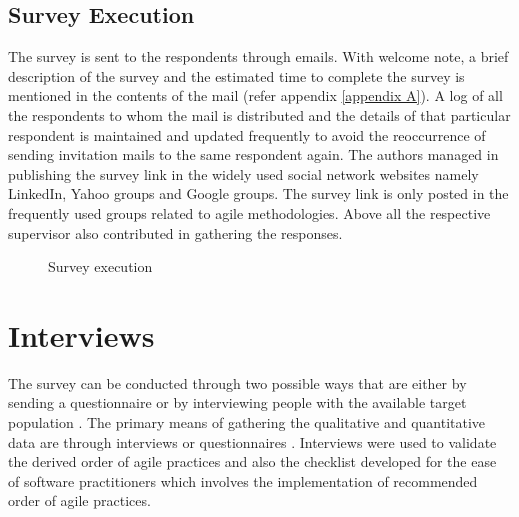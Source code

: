 \documentclass[a4paper,oneside]{bth}
\begin{document}
\subsection{Survey Execution}
The survey is sent to the respondents through emails.  With welcome note, a brief description of the survey and the estimated time to complete the survey is mentioned in the contents of the mail (refer appendix \ref{appendix A}). A log of all the respondents to whom the mail is distributed and the details of that particular respondent is maintained and updated frequently to avoid the reoccurrence of sending invitation mails to the same respondent again. The authors managed in publishing the survey link in the widely used social network websites namely LinkedIn, Yahoo groups and Google groups. The survey link is only posted in the frequently used groups related to agile methodologies. Above all the respective supervisor also contributed in gathering the responses.
\begin{figure}[h]
\centering
\label{Survey execution}
\caption{Survey execution}
\end{figure}
\newpage
\section{Interviews}
The survey can be conducted through two possible ways that are either by sending a questionnaire or by interviewing people with the available target population \cite{wohlin_empirical_2003}. The primary means of gathering the qualitative and quantitative data are through interviews or questionnaires \cite{wohlin_empirical_2003}. Interviews were used to validate the derived order of agile practices and also the checklist developed for the ease of software practitioners which involves the implementation of recommended order of agile practices.
\end{document}

